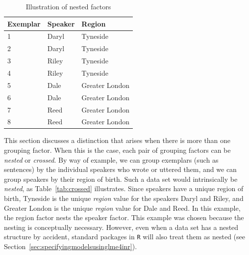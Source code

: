 \begin{table}
  \centering
  \begin{tabular}{lll}
    \toprule
    \textbf{Exemplar} & \textbf{Speaker}  & \textbf{Region}        \\
    \midrule
                    1 &           Daryl  &         Tyneside       \\
                    2 &           Daryl  &         Tyneside       \\
                    3 &           Riley  &         Tyneside       \\
                    4 &           Riley  &         Tyneside       \\
                    5 &           Dale   &         Greater London \\
                    6 &           Dale   &         Greater London \\
                    7 &           Reed   &         Greater London \\
                    8 &           Reed   &         Greater London \\
    \bottomrule
  \end{tabular}
  \caption{Illustration of nested factors}
  \label{tab:nested}
\end{table}

This section discusses a distinction that arises when there is more than one grouping factor.
When this is the case, each pair of grouping factors can be \textit{nested} or \textit{crossed}.
By way of example, we can group exemplars (such as sentences) by the individual speakers who wrote or uttered them, and we can group speakers by their region of birth.
Such a data set would intrinsically be \textit{nested}, as Table~\ref{tab:crossed} illustrates.
Since speakers have a unique region of birth, Tyneside is the unique \textit{region} value for the speakers Daryl and Riley, and Greater London is the unique \textit{region} value for Dale and Reed.
In this example, the region factor nests the speaker factor.
This example was chosen because the nesting is conceptually necessary.
However, even when a data set has a nested structure by accident, standard packages in \texttt{R} will also treat them as nested (see Section~\ref{sec:specifyingmodelsusinglme4inr}).

